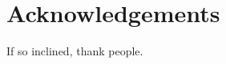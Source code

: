 \documentclass[../main]{subfiles}
\begin{document}
\chapter*{Acknowledgements}
If so inclined, thank people.
\end{document}
